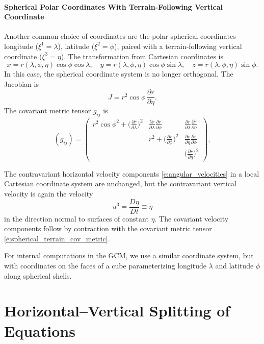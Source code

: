 \documentclass{report}
\begin{document}
\paragraph{Spherical Polar Coordinates With Terrain-Following Vertical Coordinate} Another common choice of coordinates are the polar spherical coordinates longitude ($\xi^1 = \lambda$), latitude ($\xi^2 = \phi$), paired with a terrain-following vertical coordinate ($\xi^3 = \eta$). 
The transformation from Cartesian coordinates is
\[
x = r(\lambda, \phi, \eta)\cos\phi\cos\lambda, \quad y=r(\lambda, \phi, \eta)\cos\phi\sin\lambda, \quad z=r(\lambda, \phi, \eta)\sin\phi.
\]
In this case, the spherical coordinate system is no longer orthogonal. The Jacobian is \citep{Staniforth03a}
\[
J=  r^2 \cos\phi \, \frac{\partial r}{\partial \eta}.
\]
The covariant metric tensor $g_{ij}$ is 
\begin{equation}\label{e:spherical_terrain_cov_metric}
    (g_{ij}) = \left(
    \begin{matrix}
    r^2\cos\phi^2 + \big(\frac{\partial r}{\partial \lambda}\big)^2 &
    \frac{\partial r}{\partial \lambda}\frac{\partial r}{\partial \phi}& 
    \frac{\partial r}{\partial \lambda}\frac{\partial r}{\partial \eta} \\
   & 
   r^2 + \big(\frac{\partial r}{\partial \phi}\big)^2& 
   \frac{\partial r}{\partial \eta}\frac{\partial r}{\partial \phi} \\
       & & \big(\frac{\partial r}{\partial \eta}\big)^2
    \end{matrix}
    \right),
\end{equation}

The contravariant horizontal velocity components \eqref{e:angular_velocities} in a local Cartesian coordinate system are unchanged, but the contravariant vertical velocity is again the velocity
\[
u^3 = \frac{D\eta}{Dt} \equiv \dot\eta
\]
in the direction normal to surfaces of constant $\eta$. The covariant velocity components follow by contraction with the covariant metric tensor \eqref{e:spherical_terrain_cov_metric}.

For internal computations in the GCM, we use a similar coordinate system, but with coordinates on the faces of a cube parameterizing longitude $\lambda$ and latitude $\phi$ along spherical shells.

\section{Horizontal--Vertical Splitting of Equations}
\end{document}
